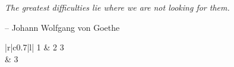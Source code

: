 \documentclass[12pt, a4paper, oneside]{report}	%
\begin{document}
\begin{enumerate}[1.]

\begin{enumerate}[1)]


\usepackage{enumitem}

\begin{enumerate}[label=\arabic*)]

\begin{enumerate}[label=\alph*)]



\usepackage[auto]{chappg}




\usepackage{epigraph}
\epigraph{\textit{The greatest difficulties lie where we are not looking for them.}}
{-- Johann Wolfgang von Goethe}




\renewcommand\contentsname{Оглавление} %

\renewcommand{\thechapter}{\arabic{chapter}.} %
\renewcommand{\thesubsection}{\arabic{section}.\arabic{subsection}.}



\begin{table}[h]\caption{Name of table}\label{name}
	\begin{tabular}{|r|c{0.7\linewidth}|l|} %
		1 & 2 3 \\

		 & 3 \\
		\multirow{}{}
	\end{tabular}
\end{table}



\end{enumerate}
\end{enumerate}
\end{enumerate}
\end{enumerate}
\end{document}
